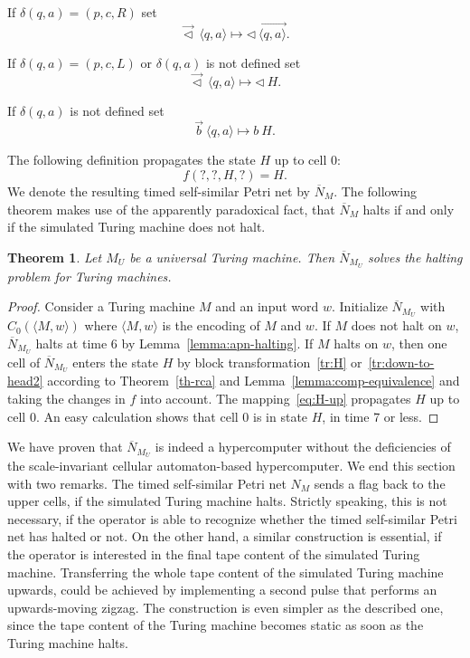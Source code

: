 \documentclass[pre,showpacs,showkeys,preprint]{revtex4}
\newtheorem{theorem}{Theorem}
\theoremstyle{definition}
\begin{document}
If $\delta(q,a) = (p,c,R)$ set
\begin{equation}
\overrightarrow{\lhd} \: \langle q, a \rangle \mapsto \lhd \:
\overrightarrow{\langle q, a \rangle}.
\label{tr:start-state2}
\end{equation}

If $\delta(q,a) = (p,c,L)$ or $\delta(q,a)$ is not defined set
\begin{equation}
\overrightarrow{\lhd} \: \langle q, a \rangle \mapsto \lhd \: H.
\label{tr:H}
\end{equation}

If $\delta(q,a)$ is not defined set
\begin{equation}
\overrightarrow{b} \: \langle q, a \rangle \mapsto b \: H.
\label{tr:down-to-head2}
\end{equation}

The following definition propagates the state $H$ up to cell $0$:
\begin{equation}
f(?, ?, H, ?) = H.
\label{eq:H-up}
\end{equation}
We denote the resulting timed self-similar Petri net by $\overline{N}_M$.
The following theorem makes use of the apparently paradoxical fact, that $\overline{N}_M$ halts if and only if the
simulated Turing machine does not halt.
\begin{theorem}
Let $M_U$ be a universal Turing machine. Then $\overline{N}_{M_U}$ solves the halting problem for Turing machines.
\end{theorem}
\begin{proof}
Consider a Turing machine $M$ and an input word $w$. Initialize $\overline{N}_{M_U}$ with $C_0(\langle M, w \rangle )$ where
$\langle M, w \rangle$ is the encoding of $M$ and $w$.
If $M$ does not halt on $w$, $\overline{N}_{M_U}$ halts at time 6 by Lemma~\ref{lemma:apn-halting}.
If $M$ halts on $w$, then one cell of $\overline{N}_{M_U}$ enters the state $H$ by
block transformation~\ref{tr:H} or~\ref{tr:down-to-head2} according to
Theorem~\ref{th-rca} and Lemma~\ref{lemma:comp-equivalence} and taking the changes in $f$ into account.
The mapping~\ref{eq:H-up} propagates $H$ up to cell 0.
An easy calculation shows that cell 0 is in state $H$, in time 7 or less.
\end{proof}

We have proven that $\overline{N}_{M_U}$ is indeed a hypercomputer without the deficiencies of the scale-invariant cellular automaton-based
hypercomputer. We end this section with two remarks.
The timed self-similar Petri net $N_M$ sends a flag back to the upper cells, if the simulated Turing machine halts.
Strictly speaking, this is not necessary, if the operator is able to recognize whether the timed self-similar Petri net has halted or not.
On the other hand, a similar construction is essential, if the operator is interested in the final tape content of the
simulated Turing machine.
Transferring the whole tape content of the simulated Turing machine upwards,
could be achieved by implementing a second pulse that performs an upwards-moving zigzag.
The construction is even simpler as the described one, since the tape content of the Turing machine becomes static as soon as the Turing machine halts.
\end{document}
